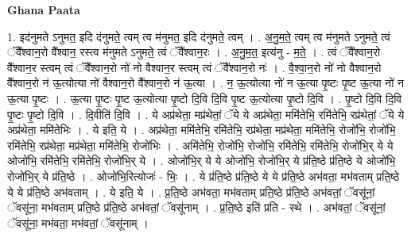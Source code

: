 \documentclass[17pt]{extarticle}
\begin{document}
\textbf{Ghana Paata } \newline

1. इद॑नुमते ऽनुमत॒ इदि द॑नुमते॒ त्वम् त्व म॑नुमत॒ इदि द॑नुमते॒ त्वम् । . अ॒नु॒म॒ते॒ त्वम् त्व म॑नुमते ऽनुमते॒ त्वं ॅवै᳚श्वान॒रो वै᳚श्वान॒ रस्त्व म॑नुमते ऽनुमते॒ त्वं ॅवै᳚श्वान॒रः । . अ॒नु॒म॒त॒ इत्य॑नु - म॒ते॒ । . त्वं ॅवै᳚श्वान॒रो वै᳚श्वान॒र स्त्वम् त्वं ॅवै᳚श्वान॒रो नो॑ नो वैश्वान॒र स्त्वम् त्वं ॅवै᳚श्वान॒रो नः॑ । . वै॒श्वा॒न॒रो नो॑ नो वैश्वान॒रो वै᳚श्वान॒रो न॑ ऊ॒त्योत्या नो॑ वैश्वान॒रो वै᳚श्वान॒रो न॑ ऊ॒त्या । . न॒ ऊ॒त्योत्या नो॑ न ऊ॒त्या पृ॒ष्टः पृ॒ष्ट ऊ॒त्या नो॑ न ऊ॒त्या पृ॒ष्टः । . ऊ॒त्या पृ॒ष्टः पृ॒ष्ट ऊ॒त्योत्या पृ॒ष्टो दि॒वि दि॒वि पृ॒ष्ट ऊ॒त्योत्या पृ॒ष्टो दि॒वि । . पृ॒ष्टो दि॒वि दि॒वि पृ॒ष्टः पृ॒ष्टो दि॒वि । . दि॒वीति॑ दि॒वि । . ये अप्र॑थेता॒ मप्र॑थेतां॒ ॅये ये अप्र॑थेता॒ ममि॑तेभि॒ रमि॑तेभि॒ रप्र॑थेतां॒ ॅये ये अप्र॑थेता॒ ममि॑तेभिः । . ये इति॒ ये । . अप्र॑थेता॒ ममि॑तेभि॒ रमि॑तेभि॒ रप्र॑थेता॒ मप्र॑थेता॒ ममि॑तेभि॒ रोजो॑भि॒ रोजो॑भि॒ रमि॑तेभि॒ रप्र॑थेता॒ मप्र॑थेता॒ ममि॑तेभि॒ रोजो॑भिः । . अमि॑तेभि॒ रोजो॑भि॒ रोजो॑भि॒ रमि॑तेभि॒ रमि॑तेभि॒ रोजो॑भि॒र् ये ये ओजो॑भि॒ रमि॑तेभि॒ रमि॑तेभि॒ रोजो॑भि॒र् ये । . ओजो॑भि॒र् ये ये ओजो॑भि॒ रोजो॑भि॒र् ये प्र॑ति॒ष्ठे प्र॑ति॒ष्ठे ये ओजो॑भि॒ रोजो॑भि॒र् ये प्र॑ति॒ष्ठे । . ओजो॑भि॒रित्योजः॑ - भिः॒ । . ये प्र॑ति॒ष्ठे प्र॑ति॒ष्ठे ये ये प्र॑ति॒ष्ठे अभ॑वता॒ मभ॑वताम् प्रति॒ष्ठे ये ये प्र॑ति॒ष्ठे अभ॑वताम् । . ये इति॒ ये । . प्र॒ति॒ष्ठे अभ॑वता॒ मभ॑वताम् प्रति॒ष्ठे प्र॑ति॒ष्ठे अभ॑वतां॒ ॅवसू॑नां॒ ॅवसू॑ना॒ मभ॑वताम् प्रति॒ष्ठे प्र॑ति॒ष्ठे अभ॑वतां॒ ॅवसू॑नाम् । . प्र॒ति॒ष्ठे इति॑ प्रति - स्थे । . अभ॑वतां॒ ॅवसू॑नां॒ ॅवसू॑ना॒ मभ॑वता॒ मभ॑वतां॒ ॅवसू॑नाम् । \newline
\end{document}
